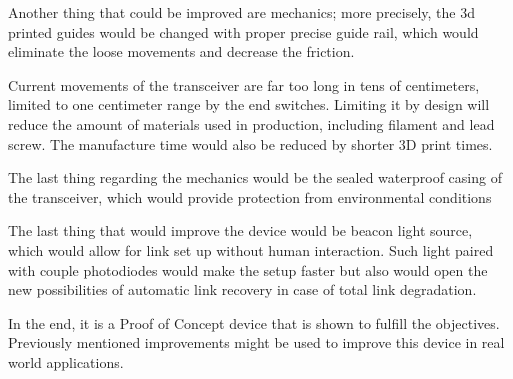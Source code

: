 \documentclass[master,oneside,en,oldtitlepage]{dyplompwr}
\begin{document}
Another thing that could be improved are mechanics; more precisely, the 3d printed guides would be changed with proper precise guide rail, which would eliminate the loose movements and decrease the friction.

Current movements of the transceiver are far too long in tens of centimeters, limited to one centimeter range by the end switches. 
Limiting it by design will reduce the amount of materials used in production, including filament and lead screw. 
The manufacture time would also be reduced by shorter 3D print times.


The last thing regarding the mechanics would be the sealed waterproof casing of the transceiver, which would provide protection from environmental conditions

The last thing that would improve the device would be beacon light source, which would allow for link set up without human interaction. 
Such light paired with couple photodiodes would make the setup faster but also would open the new possibilities of automatic link recovery in case of total link degradation.

In the end, it is a Proof of Concept device that is shown to fulfill the objectives. Previously mentioned improvements might be used to improve this device in real world applications.




















\newpage

\end{document}
